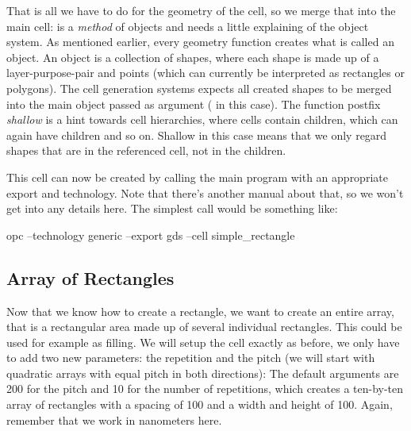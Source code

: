 That is all we have to do for the geometry of the cell, so we merge that into the main cell:
 is a \emph{method} of objects and needs a little explaining of the object system. As mentioned
earlier, every geometry function creates what is called an object. An object is a collection of shapes, where each shape is made up of a layer-purpose-pair and
points (which can currently be interpreted as rectangles or polygons). The cell generation systems expects all created shapes to be merged into the main object
passed as argument ( in this case). The function postfix \emph{shallow} is a hint towards cell hierarchies, where cells contain children, which
can again have children and so on. Shallow in this case means that we only regard shapes that are in the referenced cell, not in the children.

This cell can now be created by calling the main program with an appropriate export and technology. Note that there's another manual about that, so we won't get
into any details here. The simplest call would be something like:
\begin{shellcode}
    opc --technology generic --export gds --cell simple_rectangle
\end{shellcode}

\subsection{Array of Rectangles}
Now that we know how to create a rectangle, we want to create an entire array, that is a rectangular area made up of several individual rectangles. This could be
used for example as filling. We will setup the cell exactly as before, we only have to add two new parameters: the repetition and the pitch (we will start with
quadratic arrays with equal pitch in both directions):
The default arguments are \num{200} for the pitch and \num{10} for the number of repetitions, which creates a ten-by-ten array of rectangles with a spacing of
\num{100} and a width and height of \num{100}. Again, remember that we work in nanometers here.

